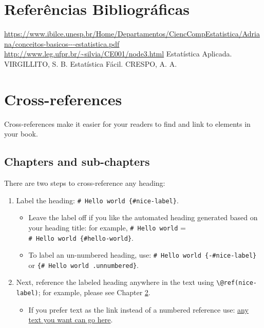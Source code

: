 \documentclass[
]{book}
\providecommand{\tightlist}{%
  \setlength{\itemsep}{0pt}\setlength{\parskip}{0pt}}
\theoremstyle{definition}
\theoremstyle{definition}
\theoremstyle{definition}
\theoremstyle{definition}
\theoremstyle{remark}
\begin{document}
\hypertarget{referuxeancias-bibliogruxe1ficas}{%
\chapter{Referências Bibliográficas}\label{referuxeancias-bibliogruxe1ficas}}

\url{https://www.ibilce.unesp.br/Home/Departamentos/CiencCompEstatistica/Adriana/conceitos-basicos---estatistica.pdf}
\url{http://www.leg.ufpr.br/~silvia/CE001/node3.html}
Estatística Aplicada. VIRGILLITO, S. B.
Estatística Fácil. CRESPO, A. A.

\hypertarget{cross}{%
\chapter{Cross-references}\label{cross}}

Cross-references make it easier for your readers to find and link to elements in your book.

\hypertarget{chapters-and-sub-chapters}{%
\section{Chapters and sub-chapters}\label{chapters-and-sub-chapters}}

There are two steps to cross-reference any heading:

\begin{enumerate}
\def\labelenumi{\arabic{enumi}.}
\tightlist
\item
  Label the heading: \texttt{\#\ Hello\ world\ \{\#nice-label\}}.

  \begin{itemize}
  \tightlist
  \item
    Leave the label off if you like the automated heading generated based on your heading title: for example, \texttt{\#\ Hello\ world} = \texttt{\#\ Hello\ world\ \{\#hello-world\}}.
  \item
    To label an un-numbered heading, use: \texttt{\#\ Hello\ world\ \{-\#nice-label\}} or \texttt{\{\#\ Hello\ world\ .unnumbered\}}.
  \end{itemize}
\item
  Next, reference the labeled heading anywhere in the text using \texttt{\textbackslash{}@ref(nice-label)}; for example, please see Chapter \ref{cross}.

  \begin{itemize}
  \tightlist
  \item
    If you prefer text as the link instead of a numbered reference use: \protect\hyperlink{cross}{any text you want can go here}.
  \end{itemize}
\end{enumerate}
\end{document}
